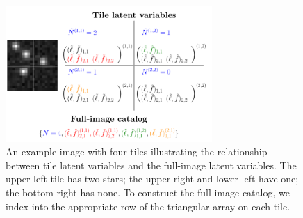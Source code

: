 


\begin{figure}[!tb]
    \centering
    \includegraphics[width = 0.7\textwidth]{figures/vi_figures/tile_to_full_schematic.png}
    \caption{An example image with four tiles illustrating the relationship between tile latent variables and the full-image latent variables. The upper-left tile has two stars; the upper-right and lower-left have one; the bottom right has none. 
    To construct the full-image catalog, we index into the appropriate row of the triangular array on each tile.}
    \label{fig:tile_to_full_schm}
\end{figure}


